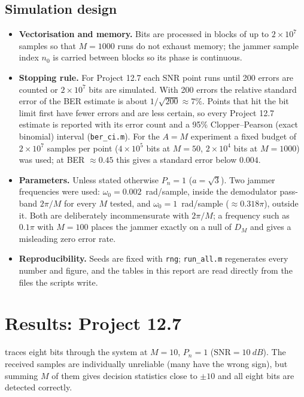 \documentclass[11pt,a4paper]{article}
\newcommand{\snr}{\mathrm{SNR}}
\begin{document}
\subsection{Simulation design}

\begin{itemize}
  \item \textbf{Vectorisation and memory.} Bits are processed in blocks of up to
        $2\times10^7$ samples so that $M=1000$ runs do not exhaust memory; the
        jammer sample index $n_0$ is carried between blocks so its phase is continuous.
  \item \textbf{Stopping rule.} For Project 12.7 each SNR point runs until 200 errors
        are counted or $2\times10^7$ bits are simulated. With 200 errors the relative
        standard error of the BER estimate is about $1/\sqrt{200}\approx7\%$. Points
        that hit the bit limit first have fewer errors and are less certain, so
        every Project 12.7 estimate is reported with its error count and a 95\%
        Clopper--Pearson (exact binomial) interval (\texttt{ber\_ci.m}).
        For the $A=M$ experiment a fixed budget of $2\times10^7$ samples per point
        ($4\times10^5$ bits at $M=50$, $2\times10^4$ bits at $M=1000$) was used;
        at BER $\approx0.45$ this gives a standard error below $0.004$.
  \item \textbf{Parameters.} Unless stated otherwise $P_n=1$ ($a=\sqrt3$). Two jammer
        frequencies were used: $\omega_0=0.002$~rad/sample, inside the demodulator
        pass-band $2\pi/M$ for every $M$ tested, and $\omega_0=1$~rad/sample
        ($\approx0.318\pi$), outside it. Both are deliberately incommensurate with
        $2\pi/M$; a frequency such as $0.1\pi$ with $M=100$ places the jammer exactly
        on a null of $D_M$ and gives a misleading zero error rate.
  \item \textbf{Reproducibility.} Seeds are fixed with \texttt{rng}; \texttt{run\_all.m}
        regenerates every number and figure, and the tables in this report are read
        directly from the files the scripts write.
\end{itemize}

\section{Results: Project 12.7}\label{sec:res127}

 traces eight bits through the system at $M=10$, $P_n=1$
($\snr=\SI{10}{dB}$). The received samples are individually unreliable (many have
the wrong sign), but summing $M$ of them gives decision statistics close to
$\pm10$ and all eight bits are detected correctly.
\end{document}
